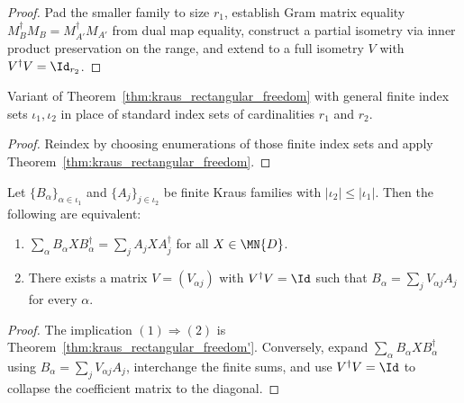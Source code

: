 \begin{proof}
    \leanok
    Pad the smaller family to size $r_1$, establish Gram matrix equality
    $M_B^\dagger M_B = M_{A'}^\dagger M_{A'}$ from dual map equality,
    construct a partial isometry via inner product preservation on the
    range, and extend to a full isometry $V$ with $V^\dagger V = \Id_{r_2}$.
\end{proof}

\begin{theorem}\label{thm:kraus_rectangular_freedom'}
    \leanok
    Variant of Theorem~\ref{thm:kraus_rectangular_freedom} with general
    finite index sets $\iota_1, \iota_2$ in place of standard index sets of
    cardinalities $r_1$ and $r_2$.
\end{theorem}

\begin{proof}
    \leanok
    Reindex by choosing enumerations of those finite index sets and apply
    Theorem~\ref{thm:kraus_rectangular_freedom}.
\end{proof}

\begin{theorem}
    \label{thm:kraus_isometry_freedom_iff}
    \leanok
    Let $\{B_\alpha\}_{\alpha \in \iota_1}$ and $\{A_j\}_{j \in \iota_2}$
    be finite Kraus families with $|\iota_2| \le |\iota_1|$.
    Then the following are equivalent:
    \begin{enumerate}
        \item $\sum_\alpha B_\alpha X B_\alpha^\dagger
                  = \sum_j A_j X A_j^\dagger$ for all $X \in \MN{D}$.
        \item There exists a matrix $V = (V_{\alpha j})$ with
              $V^\dagger V = \Id$ such that
              $B_\alpha = \sum_j V_{\alpha j} A_j$ for every $\alpha$.
    \end{enumerate}
\end{theorem}

\begin{proof}
    \leanok
    The implication $(1) \Rightarrow (2)$ is
    Theorem~\ref{thm:kraus_rectangular_freedom'}.
    Conversely, expand $\sum_\alpha B_\alpha X B_\alpha^\dagger$ using
    $B_\alpha = \sum_j V_{\alpha j} A_j$, interchange the finite sums,
    and use $V^\dagger V = \Id$ to collapse the coefficient matrix to the
    diagonal.
\end{proof}

